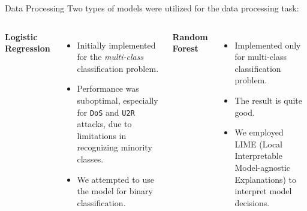 \documentclass[12pt,aspectratio=169,notheorems]{beamer}
\begin{document}
\begin{frame}{Data Processing}
    \centering
    \small Two types of models were utilized for the data processing task:
    \vspace{0.4cm}

    \begin{columns}[T]
        \textbf{Logistic Regression}
        \begin{itemize}
        \setlength\itemsep{-0.3em}
            \item Initially implemented for the \emph{multi-class} classification problem.
            \item Performance was suboptimal, especially for \texttt{DoS} and \texttt{U2R} attacks, due to limitations in recognizing minority classes.
            \item We attempted to use the model for binary classification.
        \end{itemize}

        \textbf{Random Forest}
        \begin{itemize}
        \setlength\itemsep{-0.3em}
            \item Implemented only for multi-class classification problem.
            \item The result is quite good.
            \item We employed LIME (Local Interpretable Model-agnostic Explanations) to interpret model decisions.
        \end{itemize}
    \end{columns}
\end{frame}
\end{document}

